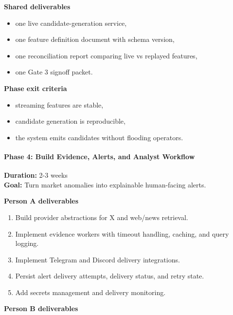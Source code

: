 \documentclass[
]{article}
\providecommand{\tightlist}{%
  \setlength{\itemsep}{0pt}\setlength{\parskip}{0pt}}
\begin{document}
\textbf{Shared deliverables}

\begin{itemize}
\tightlist
\item
  one live candidate-generation service,
\item
  one feature definition document with schema version,
\item
  one reconciliation report comparing live vs replayed features,
\item
  one Gate 3 signoff packet.
\end{itemize}

\textbf{Phase exit criteria}

\begin{itemize}
\tightlist
\item
  streaming features are stable,
\item
  candidate generation is reproducible,
\item
  the system emits candidates without flooding operators.
\end{itemize}

\paragraph{Phase 4: Build Evidence, Alerts, and Analyst
Workflow}\label{phase-4-build-evidence-alerts-and-analyst-workflow}

\textbf{Duration:} 2-3 weeks\\
\textbf{Goal:} Turn market anomalies into explainable human-facing
alerts.

\textbf{Person A deliverables}

\begin{enumerate}
\def\labelenumi{\arabic{enumi}.}
\tightlist
\item
  Build provider abstractions for X and web/news retrieval.
\item
  Implement evidence workers with timeout handling, caching, and query
  logging.
\item
  Implement Telegram and Discord delivery integrations.
\item
  Persist alert delivery attempts, delivery status, and retry state.
\item
  Add secrets management and delivery monitoring.
\end{enumerate}

\textbf{Person B deliverables}
\end{document}
